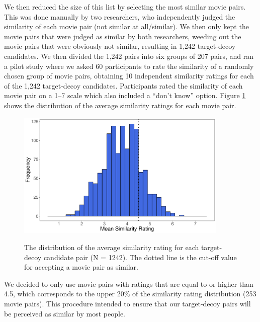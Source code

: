 \documentclass[12pt, a4paper]{article}
\begin{document}
We then reduced the size of this list by selecting the most similar movie pairs. This was done manually by two researchers, who independently judged the similarity of each movie pair (not similar at all/similar). We then only kept the movie pairs that were judged as similar by both researchers, weeding out the movie pairs that were obviously not similar, resulting in 1,242 target-decoy candidates. We then divided the 1,242 pairs into six groups of 207 pairs, and ran a pilot study where we asked 60 participants to rate the similarity of a randomly chosen group of movie pairs, obtaining 10 independent similarity ratings for each of the 1,242 target-decoy candidates. Participants rated the similarity of each movie pair on a 1--7 scale which also included a ``don't know'' option. Figure \ref{fig:exp2_pilot}  shows the distribution of the average similarity ratings for each movie pair.

\begin{figure}[htb!]
\centering
\captionsetup{justification=centering}
		\caption{The distribution of the average similarity rating for each target-decoy candidate pair (N = 1242). The dotted line is the cut-off value for accepting a movie pair as similar.}
\includegraphics[width=0.9\textwidth]{figure2.pdf}
\label{fig:exp2_pilot}
\end{figure}

We decided to only use movie pairs with ratings that are equal to or higher than 4.5, which corresponds to the upper 20\% of the similarity rating distribution (253 movie pairs). This procedure intended to ensure that our target-decoy pairs will be perceived as similar by most people.
\end{document}
